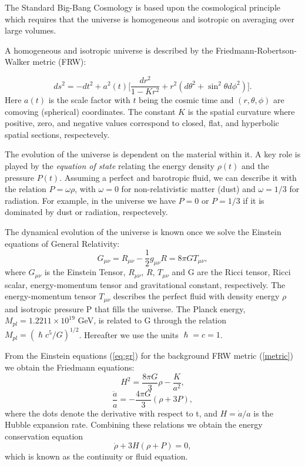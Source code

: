 \documentclass[11pt,a4paper,twoside]{book}
\begin{document}
The Standard Big-Bang Cosmology is based upon the cosmological principle which requires that the universe is homogeneous and isotropic on averaging over large volumes. 

A homogeneous and isotropic universe is described by the Friedmann-Robertson-Walker metric (FRW):

\begin{equation}
	\label{metric}	
	ds^{2}   = - dt^{2} + a^{2}(t)\Big[\frac{dr^{2}}{1-Kr^{2}}  +  r^{2}(d\theta^{2} + \sin^{2} \theta d\phi^{2})\Big] . 
\end{equation}
Here $a(t)$ is the scale factor with $ t $ being the cosmic time and $(r,\theta,\phi) $ are comoving (spherical) coordinates. The constant $ K $ is the spatial curvature where positive, zero, and negative values correspond to closed, flat, and hyperbolic spatial sections, respectevely. 

The evolution of the universe is dependent on the material within it. A key role is played by the \textit{equation of state} relating the energy density $ \rho (t) $ and the pressure $ P(t) $. Assuming a perfect and barotropic fluid, we can describe it with the relation $ P=\omega\rho $, with $ \omega=0 $ for non-relativistic matter (dust) and $ \omega=1/3 $ for radiation.
For example, in the universe we have $ P=0 $ or $ P=1/3 $ if it is dominated by dust or radiation, respectevely. 

The dynamical evolution of the universe is known once we solve the Einstein equations of General Relativity:
\begin{equation}
	\label{eq:gr}
	G_{\mu\nu}  = R_{\mu\nu} - \frac{1}{2}g_{\mu\nu}R=8\pi G T_{\mu\nu},
\end{equation}
where $ G_{\mu\nu} $ is the Einstein Tensor, $ R_{\mu\nu} $, $ R $, $ T_{\mu\nu}$ and G are the Ricci tensor, Ricci scalar, energy-momentum tensor and gravitational constant, respectively. The energy-momentum tensor $ T_{\mu\nu} $ describes the perfect fluid with density energy $ \rho $ and isotropic pressure P that fills the universe.
The Planck energy, $M_{pl}=1.2211 \times 10^{19}$ GeV, is related to G through the relation $ M_{pl} = (\hslash c^{5}/G)^{1/2}$. Hereafter we use the units $ \hslash = c = 1 $.

From the Einstein equations (\ref{eq:gr}) for the background FRW metric (\ref{metric}) we obtain the Friedmann equations:
\begin{equation}
	\label{friedmannEquations1}
	H^{2}=\frac{8\pi G}{3}\rho - \frac{K}{a^{2}},
\end{equation}
\begin{equation}
	\label{friedmannEquations2}	
	\frac{\ddot{a}}{a} = -\frac{4\pi G}{3}(\rho + 3P),
\end{equation}
where the dots denote the derivative with respect to t, and $ H=\dot{a}/a $ is the Hubble expansion rate. Combining these relations we obtain the energy conservation equation 
\begin{equation}
	\label{energyCons}
	\dot{\rho} + 3H(\rho + P)=0,
\end{equation}
which is known as the continuity or fluid equation.
\end{document}
